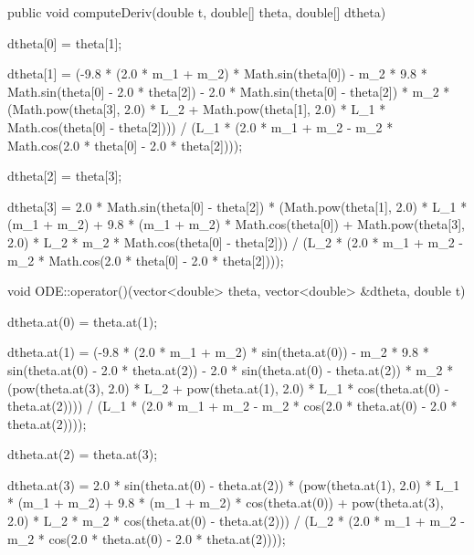 \begin{listing}[ht]
\begin{java1}
public void computeDeriv(double t, double[] theta, double[] dtheta) {
	dtheta[0] = theta[1];

	dtheta[1] = (-9.8 * (2.0 * m_1 + m_2) * Math.sin(theta[0]) - m_2 * 9.8 * Math.sin(theta[0] - 2.0 * theta[2]) - 2.0 * Math.sin(theta[0] - theta[2]) * m_2 * (Math.pow(theta[3], 2.0) * L_2 + Math.pow(theta[1], 2.0) * L_1 * Math.cos(theta[0] - theta[2]))) 
		/ (L_1 * (2.0 * m_1 + m_2 - m_2 * Math.cos(2.0 * theta[0] - 2.0 * theta[2])));
	
	dtheta[2] = theta[3];

	dtheta[3] = 2.0 * Math.sin(theta[0] - theta[2]) * (Math.pow(theta[1], 2.0) * L_1 * (m_1 + m_2) + 9.8 * (m_1 + m_2) * Math.cos(theta[0]) + Math.pow(theta[3], 2.0) * L_2 * m_2 * Math.cos(theta[0] - theta[2])) 
		/ (L_2 * (2.0 * m_1 + m_2 - m_2 * Math.cos(2.0 * theta[0] - 2.0 * theta[2])));
}
\end{java1}
\label{code_javadbl}
\end{listing}

\begin{listing}[ht]
\begin{cplusplus1}
void ODE::operator()(vector<double> theta, vector<double> &dtheta, double t) {
	dtheta.at(0) = theta.at(1);

	dtheta.at(1) = (-9.8 * (2.0 * m_1 + m_2) * sin(theta.at(0)) - m_2 * 9.8 * sin(theta.at(0) - 2.0 * theta.at(2)) - 2.0 * sin(theta.at(0) - theta.at(2)) * m_2 * (pow(theta.at(3), 2.0) * L_2 + pow(theta.at(1), 2.0) * L_1 * cos(theta.at(0) - theta.at(2)))) 
		/ (L_1 * (2.0 * m_1 + m_2 - m_2 * cos(2.0 * theta.at(0) - 2.0 * theta.at(2))));
	
	dtheta.at(2) = theta.at(3);

	dtheta.at(3) = 2.0 * sin(theta.at(0) - theta.at(2)) * (pow(theta.at(1), 2.0) * L_1 * (m_1 + m_2) + 9.8 * (m_1 + m_2) * cos(theta.at(0)) + pow(theta.at(3), 2.0) * L_2 * m_2 * cos(theta.at(0) - theta.at(2))) 
		/ (L_2 * (2.0 * m_1 + m_2 - m_2 * cos(2.0 * theta.at(0) - 2.0 * theta.at(2))));
}
\end{cplusplus1}
\label{code_cppdbl}
\end{listing} 
